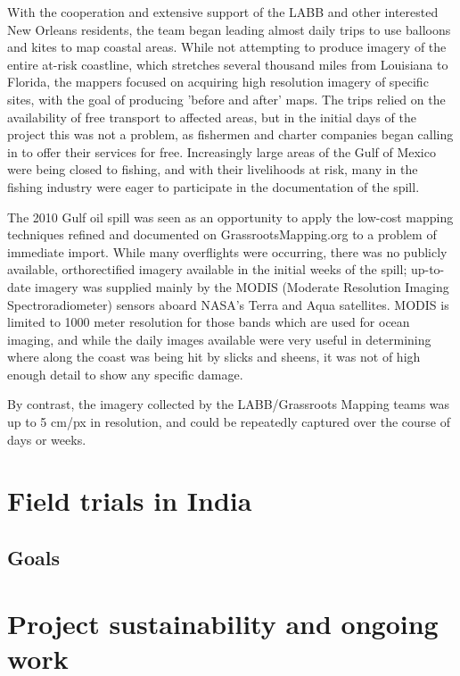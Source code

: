 \documentclass[11pt]{report}
\begin{document}
With the cooperation and extensive support of the LABB and other interested New Orleans residents, the team began leading almost daily trips to use balloons and kites to map coastal areas. While not attempting to produce imagery of the entire at-risk coastline, which stretches several thousand miles from Louisiana to Florida, the mappers focused on acquiring high resolution imagery of specific sites, with the goal of producing 'before and after' maps. The trips relied on the availability of free transport to affected areas, but in the initial days of the project this was not a problem, as fishermen and charter companies began calling in to offer their services for free. Increasingly large areas of the Gulf of Mexico were being closed to fishing, and with their livelihoods at risk, many in the fishing industry were eager to participate in the documentation of the spill. 


The 2010 Gulf oil spill was seen as an opportunity to apply the low-cost mapping techniques refined and documented on GrassrootsMapping.org to a problem of immediate import. While many overflights were occurring, there was no publicly available, orthorectified imagery available in the initial weeks of the spill; up-to-date imagery was supplied mainly by the MODIS (Moderate Resolution Imaging Spectroradiometer) sensors aboard NASA's Terra and Aqua satellites. MODIS is limited to 1000 meter resolution for those bands which are used for ocean imaging, and while the daily images available were very useful in determining where along the coast was being hit by slicks and sheens, it was not of high enough detail to show any specific damage. 


By contrast, the imagery collected by the LABB/Grassroots Mapping teams was up to 5 cm/px in resolution, and could be repeatedly captured over the course of days or weeks.  


\chapter{Field trials in India}
\section{Goals}

\chapter{Project sustainability and ongoing work}
\end{document}
